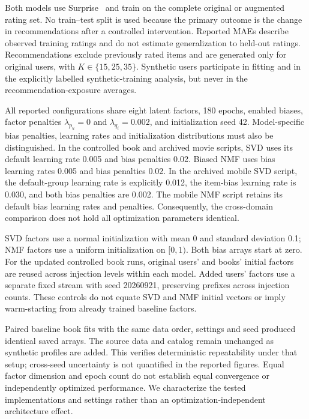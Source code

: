 \documentclass[information,article,submit,pdftex,moreauthors]{Definitions/mdpi}
\begin{document}
Both models use Surprise~\cite{hug2020surprise} and train on the complete original or augmented rating set. No train--test split is used because the primary outcome is the change in recommendations after a controlled intervention. Reported MAEs describe observed training ratings and do not estimate generalization to held-out ratings. Recommendations exclude previously rated items and are generated only for original users, with $K\in\{15,25,35\}$. Synthetic users participate in fitting and in the explicitly labelled synthetic-training analysis, but never in the recommendation-exposure averages.

All reported configurations share eight latent factors, 180 epochs, enabled biases, factor penalties $\lambda_{p_u}=0$ and $\lambda_{q_i}=0.002$, and initialization seed 42. Model-specific bias penalties, learning rates and initialization distributions must also be distinguished. In the controlled book and archived movie scripts, SVD uses its default learning rate 0.005 and bias penalties 0.02. Biased NMF uses bias learning rates 0.005 and bias penalties 0.02. In the archived mobile SVD script, the default-group learning rate is explicitly 0.012, the item-bias learning rate is 0.030, and both bias penalties are 0.002. The mobile NMF script retains its default bias learning rates and penalties. Consequently, the cross-domain comparison does not hold all optimization parameters identical.

SVD factors use a normal initialization with mean 0 and standard deviation 0.1; NMF factors use a uniform initialization on $[0,1)$. Both bias arrays start at zero. For the updated controlled book runs, original users' and books' initial factors are reused across injection levels within each model. Added users' factors use a separate fixed stream with seed 20260921, preserving prefixes across injection counts. These controls do not equate SVD and NMF initial vectors or imply warm-starting from already trained baseline factors.

Paired baseline book fits with the same data order, settings and seed produced identical saved arrays. The source data and catalog remain unchanged as synthetic profiles are added. This verifies deterministic repeatability under that setup; cross-seed uncertainty is not quantified in the reported figures. Equal factor dimension and epoch count do not establish equal convergence or independently optimized performance. We characterize the tested implementations and settings rather than an optimization-independent architecture effect.
\end{document}
